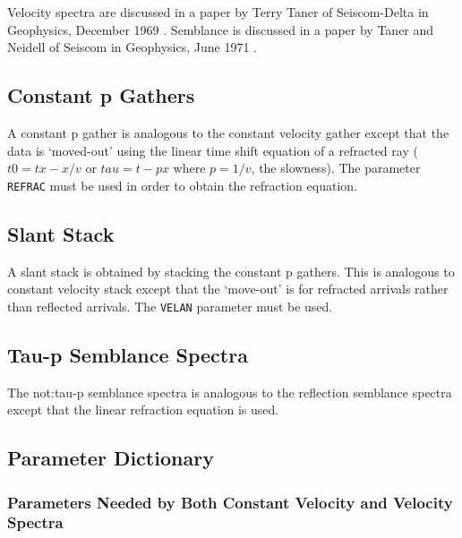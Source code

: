 Velocity spectra are discussed in a paper by Terry Taner of
Seiscom-Delta in Geophysics, December 1969 \cite{Taner1969}.  Semblance is discussed in a
paper by Taner and Neidell of Seiscom in Geophysics, June 1971 \cite{Neidell1971}.

\subsection{Constant p Gathers}

A constant p \gls{gather} is analogous to the constant velocity \gls{gather} except
that the data is `moved-out' using the linear time shift equation of a
refracted ray ($t0=tx-x/v$ or $tau=t-px$ where $p=1/v$, the slowness).  The
parameter \texttt{REFRAC} must be used in order to obtain the refraction equation.

\subsection{Slant Stack}

A slant stack is obtained by stacking the constant p \glspl{gather}.   This is
analogous to constant velocity stack except that the `move-out' is for
refracted arrivals rather than reflected arrivals.  The \texttt{VELAN} parameter
must be used.

\subsection{Tau-p Semblance Spectra}

The \gls{not:tau}-p semblance spectra is analogous to the reflection semblance
spectra except that the linear refraction equation is used.

\subsection{Parameter Dictionary}

\subsubsection{Parameters Needed by Both Constant Velocity and Velocity Spectra}

